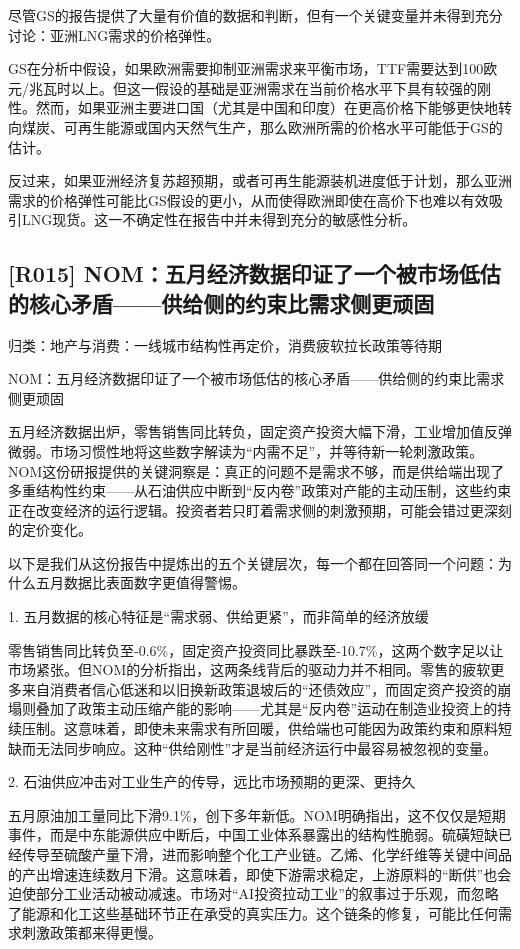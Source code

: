 \documentclass[11pt]{ctexart}
\begin{document}
尽管GS的报告提供了大量有价值的数据和判断，但有一个关键变量并未得到充分讨论：亚洲LNG需求的价格弹性。

GS在分析中假设，如果欧洲需要抑制亚洲需求来平衡市场，TTF需要达到100欧元/兆瓦时以上。但这一假设的基础是亚洲需求在当前价格水平下具有较强的刚性。然而，如果亚洲主要进口国（尤其是中国和印度）在更高价格下能够更快地转向煤炭、可再生能源或国内天然气生产，那么欧洲所需的价格水平可能低于GS的估计。

反过来，如果亚洲经济复苏超预期，或者可再生能源装机进度低于计划，那么亚洲需求的价格弹性可能比GS假设的更小，从而使得欧洲即使在高价下也难以有效吸引LNG现货。这一不确定性在报告中并未得到充分的敏感性分析。

\subsection{[R015] NOM：五月经济数据印证了一个被市场低估的核心矛盾——供给侧的约束比需求侧更顽固}
{\small\color{refgray}归类：地产与消费：一线城市结构性再定价，消费疲软拉长政策等待期}

NOM：五月经济数据印证了一个被市场低估的核心矛盾——供给侧的约束比需求侧更顽固

五月经济数据出炉，零售销售同比转负，固定资产投资大幅下滑，工业增加值反弹微弱。市场习惯性地将这些数字解读为“内需不足”，并等待新一轮刺激政策。NOM这份研报提供的关键洞察是：真正的问题不是需求不够，而是供给端出现了多重结构性约束——从石油供应中断到“反内卷”政策对产能的主动压制，这些约束正在改变经济的运行逻辑。投资者若只盯着需求侧的刺激预期，可能会错过更深刻的定价变化。

以下是我们从这份报告中提炼出的五个关键层次，每一个都在回答同一个问题：为什么五月数据比表面数字更值得警惕。

1. 五月数据的核心特征是“需求弱、供给更紧”，而非简单的经济放缓

零售销售同比转负至-0.6\%，固定资产投资同比暴跌至-10.7\%，这两个数字足以让市场紧张。但NOM的分析指出，这两条线背后的驱动力并不相同。零售的疲软更多来自消费者信心低迷和以旧换新政策退坡后的“还债效应”，而固定资产投资的崩塌则叠加了政策主动压缩产能的影响——尤其是“反内卷”运动在制造业投资上的持续压制。这意味着，即使未来需求有所回暖，供给端也可能因为政策约束和原料短缺而无法同步响应。这种“供给刚性”才是当前经济运行中最容易被忽视的变量。

2. 石油供应冲击对工业生产的传导，远比市场预期的更深、更持久

五月原油加工量同比下滑9.1\%，创下多年新低。NOM明确指出，这不仅仅是短期事件，而是中东能源供应中断后，中国工业体系暴露出的结构性脆弱。硫磺短缺已经传导至硫酸产量下滑，进而影响整个化工产业链。乙烯、化学纤维等关键中间品的产出增速连续数月下滑。这意味着，即使下游需求稳定，上游原料的“断供”也会迫使部分工业活动被动减速。市场对“AI投资拉动工业”的叙事过于乐观，而忽略了能源和化工这些基础环节正在承受的真实压力。这个链条的修复，可能比任何需求刺激政策都来得更慢。
\end{document}
